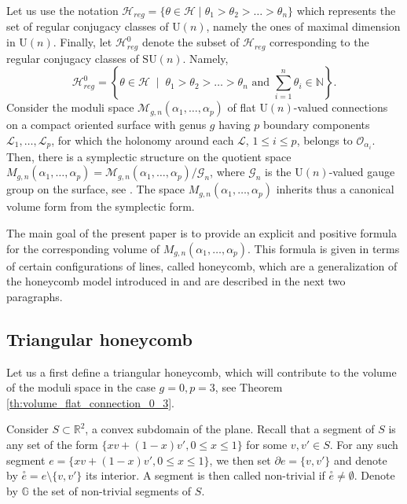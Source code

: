 \documentclass[11pt,a4paper]{amsart}
\providecommand{\U}{\mathrm U}
\providecommand{\SU}{\mathrm {SU}}
\numberwithin{equation}{section}
\theoremstyle{definition}
\begin{document}
\noindent
Let us use the notation $\mathcal{H}_{reg}=
\{\theta\in \mathcal{H} \mid
\theta_1>\theta_2>\ldots>\theta_n\}$ which
represents the set of regular 
conjugacy classes of $\U(n)$, namely the ones of maximal 
dimension in $\U(n)$. Finally, let $\mathcal{H}_{reg}^0$ denote the subset of $\mathcal{H}_{reg}$ corresponding to the regular conjugacy classes of $\SU(n)$. Namely,
$$\mathcal{H}_{reg}^0=\left\{\theta\in \mathcal{H} \; 
\mid  \; 
\theta_1>\theta_2>\ldots>\theta_n \text{ and }\sum_{i=1}^n \theta_i\in\mathbb{N}\right\}.$$
Consider the moduli space $\mathcal{M}_{g, n}(\alpha_1, \dots, \alpha_p)$ of flat $\U(n)$-valued connections 
on a compact oriented surface with genus $g$ having $p$ 
boundary components $\mathcal{L}_1,\ldots,\mathcal{L}_p$, for which the holonomy around 
each $\mathcal{L}$, $1\leqslant i\leqslant p$, belongs to 
$\mathcal{O}_{\alpha_i}$. Then, there is a symplectic structure on the quotient space $M_{g, n}(\alpha_1, \dots, \alpha_p)=\mathcal{M}_{g, n}(\alpha_1, \dots, \alpha_p)/\mathcal{G}_n$, where $\mathcal{G}_n$ is the $\U(n)$-valued gauge group on the surface, see \cite{meinrenken1999moduli}. The space $M_{g, n}(\alpha_1, \dots, \alpha_p)$ inherits thus a canonical volume form from the symplectic form. 

The main goal of the present paper is to provide an explicit and positive formula for the corresponding volume of $M_{g, n}(\alpha_1, \dots, \alpha_p)$. This formula is given in terms of certain configurations of lines, called honeycomb, which are a generalization of the honeycomb model introduced in \cite{knutson2004honeycomb} and are described in the next two paragraphs.

\subsection{Triangular honeycomb}\label{subsec:triangular_honey} Let us a first define a triangular honeycomb, which will contribute to the volume of the moduli space in the case $g=0,p=3$, see Theorem \ref{th:volume_flat_connection_0_3}. 

\noindent
Consider $S\subset \mathbb{R}^2$, a convex subdomain of the plane. Recall that a segment of $S$ is any set of the form $\{xv+(1-x)v', 0\leqslant x\leqslant 1\}$ for some $v,v'\in S$. For any such segment $e=\{xv+(1-x)v', 0\leqslant x\leqslant 1\}$, we then set $\partial e=\{v,v'\}$ 
and denote by $\overset{\circ}{e} =e\setminus \{v,v'\}$ its interior. A segment is then called non-trivial if $\overset{\circ}{e}\not=\emptyset$. Denote by  $\mathbb{G}$ the set of non-trivial segments of $S$.
\end{document}
